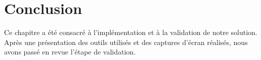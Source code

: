 \newpage
\section*{Conclusion}
Ce chapitre a été consacré à l’implémentation et à la validation de notre solution. Après une
présentation des outils utilisés et des captures d’écran réalisés, nous avons passé en revue l'étape de validation.






